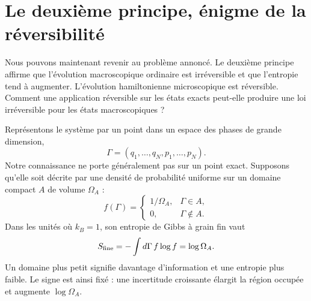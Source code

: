 \begin{classroomqa}
\end{classroomqa}

\section{Le deuxième principe, énigme de la réversibilité}

Nous pouvons maintenant revenir au problème annoncé. Le deuxième principe affirme que l’évolution macroscopique ordinaire est irréversible et que l’entropie tend à augmenter. L’évolution hamiltonienne microscopique est réversible. Comment une application réversible sur les états exacts peut-elle produire une loi irréversible pour les états macroscopiques ?

Représentons le système par un point dans un espace des phases de grande dimension, \[
 \Gamma=(q_1,\ldots,q_N,p_1,\ldots,p_N).
\]Notre connaissance ne porte généralement pas sur un point exact. Supposons qu’elle soit décrite par une densité de probabilité uniforme sur un domaine compact \(A\) de volume \(\Omega_A\) : \begin{equation}
 f(\Gamma)=
 \begin{cases}
  1/\Omega_A,&\Gamma\in A,\\
  0,&\Gamma\notin A.
 \end{cases}
 \label{eq:sm7-uniform-blob}
\end{equation}Dans les unités où \(k_B=1\), son entropie de Gibbs à grain fin vaut \begin{equation}
 S_{\rm fine}
 =-\int d\Gamma\,f\log f
 =\log\Omega_A.
 \label{eq:sm7-blob-entropy}
\end{equation}Un domaine plus petit signifie davantage d’information et une entropie plus faible. Le signe est ainsi fixé : une incertitude croissante élargit la région occupée et augmente \(\log\Omega_A\).

